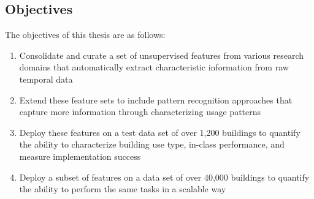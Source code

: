 \subsection{Objectives}
The objectives of this thesis are as follows:
\begin{enumerate}
\item Consolidate and curate a set of unsupervised features from various research domains that automatically extract characteristic information from raw temporal data
\item Extend these feature sets to include pattern recognition approaches that capture more information through characterizing usage patterns
\item Deploy these features on a test data set of over 1,200 buildings to quantify the ability to characterize building use type, in-class performance, and measure implementation success
\item Deploy a subset of features on a data set of over 40,000 buildings to quantify the ability to perform the same tasks in a scalable way
\end{enumerate}